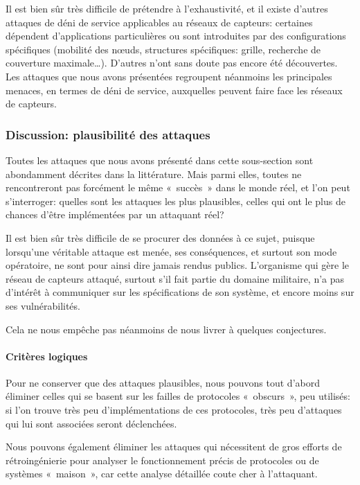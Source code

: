Il est bien sûr très difficile de prétendre à l'exhaustivité, et il existe d'autres attaques de déni de service applicables au réseaux de capteurs: certaines dépendent d'applications particulières ou sont introduites par des configurations spécifiques (mobilité des nœuds, structures spécifiques: grille, recherche de couverture maximale\dots).
D'autres n'ont sans doute pas encore été découvertes.
Les attaques que nous avons présentées regroupent néanmoins les principales menaces, en termes de déni de service, auxquelles peuvent faire face les réseaux de capteurs.

    \subsubsection{Discussion: plausibilité des attaques}
Toutes les attaques que nous avons présenté dans cette sous-section sont abondamment décrites dans la littérature.
Mais parmi elles, toutes ne rencontreront pas forcément le même « succès » dans le monde réel, et l'on peut s'interroger: quelles sont les attaques les plus plausibles, \cad celles qui ont le plus de chances d'être implémentées par un attaquant réel?

Il est bien sûr très difficile de se procurer des données à ce sujet, puisque lorsqu'une véritable attaque est menée, ses conséquences, et surtout son mode opératoire, ne sont pour ainsi dire jamais rendus publics.
L'organisme qui gère le réseau de capteurs attaqué, surtout s'il fait partie du domaine militaire, n'a pas d'intérêt à communiquer sur les spécifications de son système, et encore moins sur ses vulnérabilités.

Cela ne nous empêche pas néanmoins de nous livrer à quelques conjectures.

        \paragraph{Critères logiques}
Pour ne conserver que des attaques plausibles, nous pouvons tout d'abord éliminer celles qui se basent sur les failles de protocoles « obscurs », peu utilisés: si l'on trouve très peu d'implémentations de ces protocoles, très peu d'attaques qui lui sont associées seront déclenchées.

Nous pouvons également éliminer les attaques qui nécessitent de gros efforts de rétroingénierie pour analyser le fonctionnement précis de protocoles ou de systèmes « maison », car cette analyse détaillée coute cher à l'attaquant.

